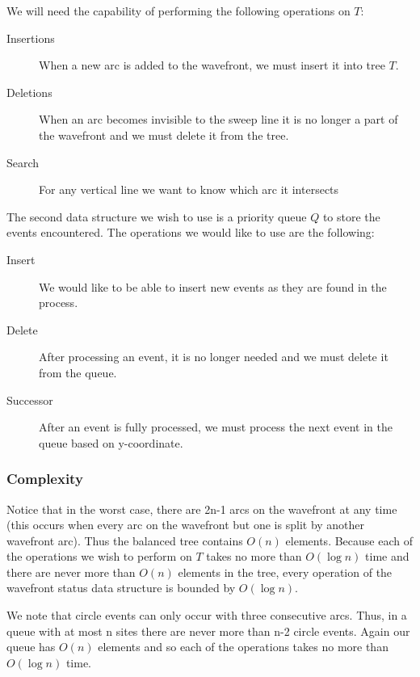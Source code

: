 We will need the capability of performing the following operations on $T$:\begin{description}

\item[Insertions] When a new arc is added to the wavefront, we must insert it
into tree $T$.

\item[Deletions] When an arc becomes invisible to the sweep line it is no
longer a part of the wavefront and we must delete it from the tree.

\item[Search] For any vertical line we want to know which arc it
intersects

\end{description}


The second data structure we wish to use is a priority queue $Q$ to store the
events encountered.  The operations we would like to use are the following:\begin{description}

\item[Insert] We would like to be able to insert new events as they are found
in the process.

\item[Delete] After processing an event, it is no longer needed and we must
delete it from the queue.

\item[Successor] After an event is fully processed, we must process the next
 event in the queue based on y-coordinate.

\end{description}



\subsubsection{Complexity}

Notice that in the worst case, there are 2n-1 arcs on the wavefront at any
time (this occurs when every arc on the wavefront but one is split by another
wavefront arc).  Thus the balanced tree contains $O(n)$ elements.
Because each of the operations we wish to perform on $T$ takes no more than
$O(\log n)$ time and there are never more than $O(n)$ elements in the tree,
every operation of the wavefront status data structure is bounded by $O(\log n)$.

We note that circle events can only occur with three consecutive arcs.  Thus,
in a queue with at most n sites there are never more than n-2 circle events.  
Again our queue has $O(n)$ elements and so each of the operations takes no more
than $O(\log n)$ time.

